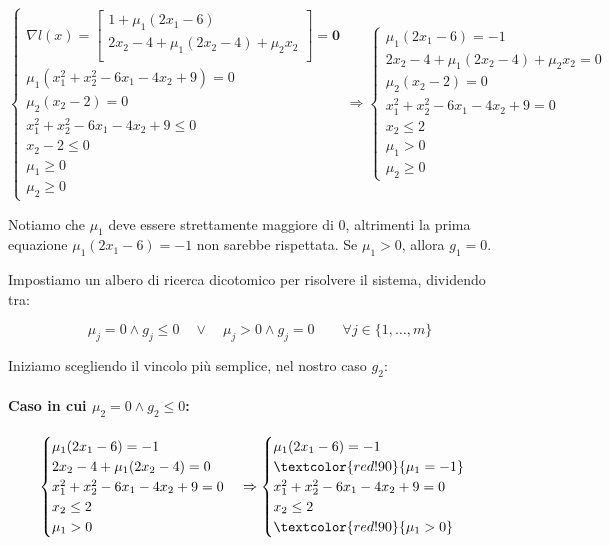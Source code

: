 \documentclass[\main/main.tex]{subfiles}
\begin{document}
\[
	\begin{cases}
		\nabla l(x) = \begin{bmatrix}
			1 + \mu_1(2x_1 - 6)                   \\
			2x_2 -4 + \mu_1(2x_2 - 4) + \mu_2 x_2 \\
		\end{bmatrix}
		= \bm{0}                            \\
		\mu_1 (x^2_1+x^2_2-6x_1-4x_2+9) = 0 \\
		\mu_2 (x_2-2) = 0                   \\
		x^2_1+x^2_2-6x_1-4x_2+9 \leq 0      \\
		x_2-2 \leq 0                        \\
		\mu_1 \geq 0                        \\
		\mu_2 \geq 0
	\end{cases}
	\Rightarrow
	\begin{cases}
		\mu_1(2x_1 - 6) = -1                      \\
		2x_2 -4 + \mu_1(2x_2 - 4) + \mu_2 x_2 = 0 \\
		\mu_2 (x_2-2) = 0                         \\
		x^2_1+x^2_2-6x_1-4x_2+9 = 0               \\
		x_2 \leq 2                                \\
		\mu_1 > 0                                 \\
		\mu_2 \geq 0
	\end{cases}
\]

Notiamo che $\mu_1$ deve essere strettamente maggiore di 0, altrimenti la prima equazione $\mu_1(2x_1 - 6) = -1$ non sarebbe rispettata. Se $\mu_1 > 0$, allora $g_1 = 0$.

Impostiamo un albero di ricerca dicotomico per risolvere il sistema, dividendo tra:

\[
	\mu_j = 0 \land g_j \leq 0 \quad \lor \quad \mu_j > 0 \land g_j = 0 \qquad \forall j \in \{1, \ldots, m\}
\]

Iniziamo scegliendo il vincolo più semplice, nel nostro caso $g_2$:

\paragraph*{Caso in cui $\mu_2 = 0 \land g_2 \leq 0$:}
\[
	\begin{cases}
		\mu_1(2x_1 - 6) = -1          \\
		2x_2 -4 + \mu_1(2x_2 - 4) = 0 \\
		x^2_1+x^2_2-6x_1-4x_2+9 = 0   \\
		x_2 \leq 2                    \\
		\mu_1 > 0
	\end{cases}
	\Rightarrow
	\begin{cases}
		\mu_1(2x_1 - 6) = -1           \\
		\textcolor{red!90}{\mu_1 = -1} \\
		x^2_1+x^2_2-6x_1-4x_2+9 = 0    \\
		x_2 \leq 2                     \\
		\textcolor{red!90}{\mu_1 > 0}
	\end{cases}
\]
\end{document}
